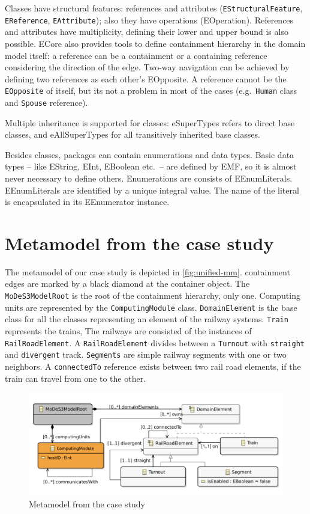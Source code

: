 Classes have structural features: references and attributes (\texttt{EStructuralFeature}, \texttt{EReference}, \texttt{EAttribute}); also they have operations (EOperation).
References and attributes have multiplicity, defining their lower and upper bound is also possible.
ECore also provides tools to define containment hierarchy in the domain model itself: a reference can be a containment or a containing reference considering the direction of the edge. 
Two-way navigation can be achieved by defining two references as each other's EOpposite. A reference cannot be the \texttt{EOpposite} of itself, but its not a problem in most of the cases (e.g.\ \texttt{Human} class and \texttt{Spouse} reference). 

Multiple inheritance is supported for classes: eSuperTypes refers to direct base classes, and eAllSuperTypes for all transitively inherited base classes.

Besides classes, packages can contain enumerations and data types. 
Basic data types -- like EString, EInt, EBoolean etc.\ -- are defined by EMF, so it is almost never necessary to define others.
Enumerations are consists of EEnumLiterals. 
EEnumLiterals are identified by a unique integral value.
The name of the literal is encapsulated in its EEnumerator instance.


\section{Metamodel from the case study}

The metamodel of our case study is depicted in \autoref{fig:unified-mm}.
containment edges are marked by a black diamond at the container object.
The \texttt{MoDeS3ModelRoot} is the root of the containment hierarchy, only one. Computing units are represented by the \texttt{ComputingModule} class. \texttt{DomainElement} is the base class for all the classes representing an element of the railway systems. \texttt{Train} represents the trains, The railways are consisted of the instances of \texttt{RailRoadElement}. A \texttt{RailRoadElement} divides between a \texttt{Turnout} with \texttt{straight} and \texttt{divergent} track. \texttt{Segments} are simple railway segments with one or two neighbors. A \texttt{connectedTo} reference exists between two rail road elements, if the train can travel from one to the other.

\begin{figure}[H]
	\begin{center}
		\includegraphics[width=\textwidth]{figures/unified-mm.pdf}
	\end{center}
	\caption{Metamodel from the case study}
	\label{fig:unified-mm}
\end{figure}


